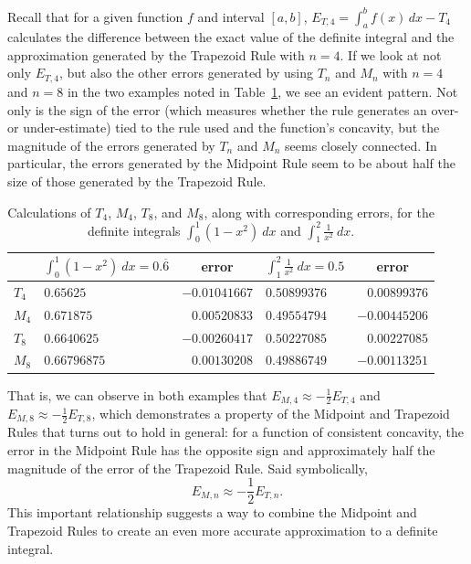 Recall that for a given function $f$ and interval $[a,b]$, $E_{T,4} = \int_a^b f(x) \,dx - T_4$ calculates the difference between the exact value of the definite integral and the approximation generated by the Trapezoid Rule with $n = 4$.  If we look at not only $E_{T,4}$, but also the other errors generated by using $T_n$ and $M_n$ with $n = 4$ and $n = 8$ in the two examples noted in Table~\ref{T:5.6.Ex2}, we see an evident pattern.  Not only is the sign of the error (which measures whether the rule generates an over- or under-estimate) tied to the rule used and the function's concavity, but the magnitude of the errors generated by $T_n$ and $M_n$ seems closely connected.  In particular, the errors generated by the Midpoint Rule seem to be about half the size of those generated by the Trapezoid Rule. 

\begin{table}[h]\small
\begin{center}
\begin{tabularx}{\textwidth}{|X|l|r||l|r|}
\hline
\T \ & $\int_0^1 (1-x^2) \ dx = 0.\overline{6} $ & \multicolumn{1}{c||}{error} & $\int_1^2 \frac{1}{x^2} \ dx = 0.5$ & \multicolumn{1}{c|}{error} \B \\
\hline \hline
\T $T_4$ & $0.65625$ & $-0.01041667$ & $0.50899376$ & $0.00899376$ \B \\
\hline
\T $M_4$ & $0.671875$ & $0.00520833$ & $0.49554794$ & $-0.00445206$ \B \\
\hline
\T $T_8$ & $0.6640625$ & $-0.00260417$ & $0.50227085$ & $0.00227085$ \B \\
\hline
\T $M_8$ & $0.66796875$ & $0.00130208$ & $0.49886749$ & $-0.00113251$ \B \\
\hline
\end{tabularx}
\end{center}
\caption{Calculations of $T_4$, $M_4$, $T_8$, and $M_8$, along with corresponding errors, for the definite integrals $\int_0^1 (1-x^2) \ dx$ and $\int_1^2 \frac{1}{x^2} \ dx$.}
\label{T:5.6.Ex2}
\end{table}\normalsize

That is, we can observe in both examples that $E_{M,4} \approx -\frac{1}{2} E_{T,4}$ and $E_{M,8} \approx -\frac{1}{2}E_{T,8}$, which demonstrates a property of the Midpoint and Trapezoid Rules that turns out to hold in general: for a function of consistent concavity, the error in the Midpoint Rule has the opposite sign and approximately half the magnitude of the error of the Trapezoid Rule.  Said symbolically,
$$E_{M,n} \approx -\frac{1}{2} E_{T,n}.$$
This important relationship suggests a way to combine the Midpoint and Trapezoid Rules to create an even more accurate approximation to a definite integral.

